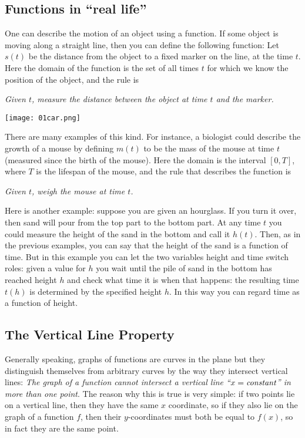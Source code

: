 \subsection{Functions in ``real life''} 
One can describe the motion of an object using a function.  If some
object is moving along a straight line, then you can define the
following function: Let $s(t)$ be the distance from the object to a
fixed marker on the line, at the time $t$.  Here the domain of the
function is the set of all times $t$ for which we know the position of
the object, and the rule is
\begin{center}
  \itshape Given $t$, measure the distance between the object at time $t$ and the
  marker.
\end{center}
\smallskip
\centerline{\texttt{[image: 01car.png]}}%
There are many examples of this kind.  For instance, a biologist could
describe the growth of a mouse by defining $m(t)$ to be the mass of the mouse
at time $t$ (measured since the birth of the mouse).  Here the domain is the
interval $[0, T]$, where $T$ is the lifespan of the mouse, and the rule
that describes the function is
\begin{center}
  \itshape Given $t$, weigh the mouse at time $t$.
\end{center}


%
Here is another example: suppose you are given an hourglass.  If you turn
it over, then sand will pour from the top part to the bottom part.  At any
time $t$ you could measure the height of the sand in the bottom and
call it $h(t)$.  Then, as in the previous examples, you can say that the height of
the sand is a function of time.  But in this example you can let the two
variables height and time switch roles: given a value for $h$ you wait
until the pile of sand in the bottom has reached height $h$ and check what
time it is when that happens: the resulting time $t(h)$ is determined by
the specified height $h$.  In this way you can regard time as a function of
height.




\subsection{The Vertical Line Property} 
Generally speaking, graphs of functions are curves in the plane but
they distinguish themselves from arbitrary curves by the way they
intersect vertical lines: \emph{The graph of a function cannot
intersect a vertical line ``$x=\text{\em constant}$'' in more than one
point}.  The reason why this is true is very simple: if two points lie
on a vertical line, then they have the same $x$ coordinate, so if they
also lie on the graph of a function $f$, then their $y$-coordinates
must both be equal to $f(x)$, so in fact they are the same point.



